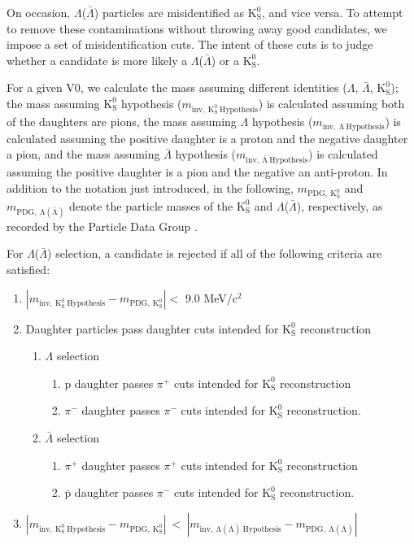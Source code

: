 \documentclass[ALICE,manyauthors]{cernphprep}
\newcommand{\Lam}{$\Lambda$\xspace}
\newcommand{\ALam}{$\bar{\Lambda}$\xspace}
\newcommand{\LamALam}{$\Lambda$($\bar{\Lambda}$)\xspace}
\newcommand{\Ks}{$\mathrm{K^{0}_{S}}$\xspace}
\begin{document}
On occasion, \LamALam particles are misidentified as \Ks, and vice versa.  
To attempt to remove these contaminations without throwing away good candidates, we impose a set of misidentification cuts.  
The intent of these cuts is to judge whether a candidate is more likely a \LamALam or a \Ks.  

For a given V0, we calculate the mass assuming different identities (\Lam, \ALam, \Ks); the mass assuming \Ks hypothesis ($m_{\mathrm{inv,~ K^{0}_{S}~ Hypothesis}}$) is calculated assuming both of the daughters are pions, the mass assuming \Lam hypothesis ($m_{\mathrm{inv,~ \Lambda~ Hypothesis}}$) is calculated assuming the positive daughter is a proton and the negative daughter a pion, and the mass assuming \ALam hypothesis ($m_{\mathrm{inv,~ \bar{\Lambda}~ Hypothesis}}$) is calculated assuming the positive daughter is a pion and the negative an anti-proton.  
In addition to the notation just introduced, in the following, $m_{\mathrm{PDG,~ K^{0}_{S}}}$ and $m_{\mathrm{PDG,~ \Lambda(\bar{\Lambda})}}$ denote the particle masses of the \Ks and \LamALam, respectively, as recorded by the Particle Data Group \cite{Patrignani:2016xqp}.

For \LamALam selection, a candidate is rejected if all of the following criteria are satisfied:

\begin{enumerate}
 \item $\left|m_{\mathrm{inv,~ K^{0}_{S}~ Hypothesis}} - m_{\mathrm{PDG,~ K^{0}_{S}}}\right| < $ 9.0 MeV/c$^{2}$
 \item Daughter particles pass daughter cuts intended for \Ks reconstruction
 \begin{enumerate}
  \item \Lam selection
  \begin{enumerate}
   \item p daughter passes $\pi^{+}$ cuts intended for \Ks reconstruction
   \item $\pi^{-}$ daughter passes $\pi^{-}$ cuts intended for \Ks reconstruction.
  \end{enumerate}
  \item \ALam selection
  \begin{enumerate}
   \item $\pi^{+}$ daughter passes $\pi^{+}$ cuts intended for \Ks reconstruction
   \item $\bar{\mathrm{p}}$ daughter passes $\pi^{-}$ cuts intended for \Ks reconstruction.
  \end{enumerate}  
 \end{enumerate}
 \item $\left|m_{\mathrm{inv,~ K^{0}_{S}~ Hypothesis}} - m_{\mathrm{PDG,~ K^{0}_{S}}}\right|~ < ~\left|m_{\mathrm{inv,~ \Lambda(\bar{\Lambda})~ Hypothesis}} - m_{\mathrm{PDG,~ \Lambda(\bar{\Lambda})}}\right|$
\end{enumerate} 
\end{document}
